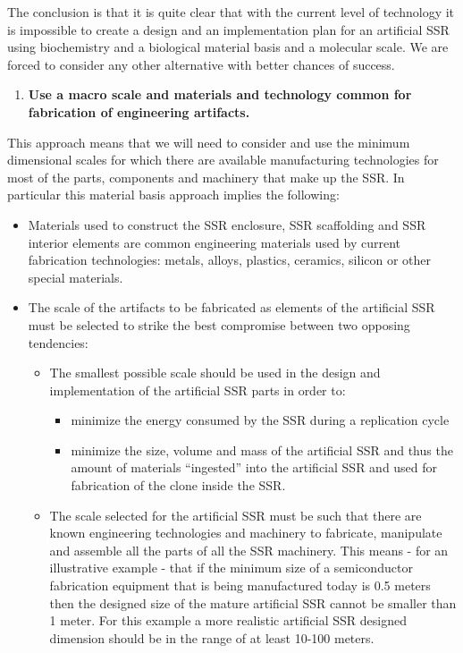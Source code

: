 The conclusion is that it is quite clear that with the current level of
technology it is impossible to create a design and an implementation
plan for an artificial SSR using biochemistry and a biological material
basis and a molecular scale. We are forced to consider any other
alternative with better chances of success.


\begin{enumerate}
\item \textbf{Use a macro scale and materials and technology common for
fabrication of engineering artifacts.}
\end{enumerate}

This approach means that we will need to consider and use the minimum
dimensional scales for which there are available manufacturing
technologies for most of the parts, components and machinery that make
up the SSR.  In particular this material basis approach implies the
following:

\begin{itemize}
\item Materials used to construct the SSR enclosure, SSR scaffolding and
SSR interior elements are common engineering materials used by current
fabrication technologies: metals, alloys, plastics, ceramics, silicon
or other special materials.
\item The scale of the artifacts to be fabricated as elements of the
artificial SSR must be selected to strike the best compromise between
two opposing tendencies:

\begin{itemize}
\item The smallest possible scale should be used in the design and
implementation of the artificial SSR parts in order to:

\begin{itemize}
\item minimize the energy consumed by the SSR during a replication cycle

\item minimize the size, volume and mass of the artificial SSR and thus
the amount of materials “ingested” into the artificial SSR and used for
fabrication of the clone inside the SSR.
\end{itemize}
\item The scale selected for the artificial SSR must be such that there
are known engineering technologies and machinery to fabricate,
manipulate and assemble all the parts of all the SSR machinery. This
means - for an illustrative example - that if the minimum size of a
semiconductor fabrication equipment that is being manufactured today is
0.5 meters then the designed size of the mature artificial SSR cannot
be smaller than 1 meter. For this example a more realistic artificial
SSR designed dimension should be in the range of at least 10-100
meters.
\end{itemize}
\end{itemize}

